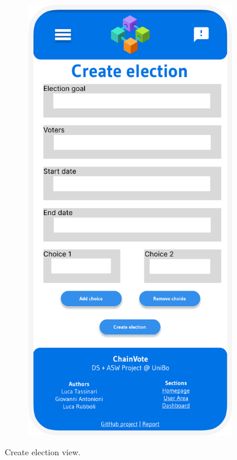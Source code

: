 \documentclass{scrartcl}
\begin{document}
\begin{figure}
    \begin{subfigure}[b]{0.3\textwidth}
        \centering
        \includegraphics[width=\textwidth]{./figures/mockups/create-election.pdf}
    \end{subfigure}
    \caption{Create election view.}
    \label{fig:create-election-view}
\end{figure}
\end{document}
